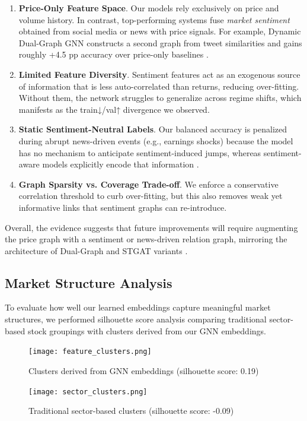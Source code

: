 \documentclass[12pt]{article}
\begin{document}
\begin{enumerate}[label=(\arabic*)]
    \item \textbf{Price-Only Feature Space}.  
          Our models rely exclusively on price and volume history.  
          In contrast, top-performing systems fuse \emph{market sentiment} obtained from social media or news with price signals.  
          For example, Dynamic Dual-Graph GNN constructs a second graph from tweet similarities and gains roughly +4.5 pp accuracy over price-only baselines \cite{du2023}.
    \item \textbf{Limited Feature Diversity}.  
          Sentiment features act as an exogenous source of information that is less auto-correlated than returns, reducing over-fitting.  
          Without them, the network struggles to generalize across regime shifts, which manifests as the train↓/val↑ divergence we observed.
    \item \textbf{Static Sentiment-Neutral Labels}.  
          Our balanced accuracy is penalized during abrupt news-driven events (e.g., earnings shocks) because the model has no mechanism to anticipate sentiment-induced jumps, whereas sentiment-aware models explicitly encode that information \cite{zhang2024}.
    \item \textbf{Graph Sparsity vs. Coverage Trade-off}.  
          We enforce a conservative correlation threshold to curb over-fitting, but this also removes weak yet informative links that sentiment graphs can re-introduce.
\end{enumerate}

Overall, the evidence suggests that future improvements will require augmenting the price graph with a sentiment or news-driven relation graph, mirroring the architecture of Dual-Graph and STGAT variants \cite{du2023,liu2025}.  

\subsection{Market Structure Analysis}

To evaluate how well our learned embeddings capture meaningful market structures, we performed silhouette score analysis comparing traditional sector-based stock groupings with clusters derived from our GNN embeddings.

\begin{figure}[h]
    \centering
    \begin{minipage}{0.48\textwidth}
        \centering
        \texttt{[image: feature\_clusters.png]}
        \caption{Clusters derived from GNN embeddings (silhouette score: 0.19)}
        \label{fig:feature_clusters}
    \end{minipage}\hfill
    \begin{minipage}{0.48\textwidth}
        \centering
        \texttt{[image: sector\_clusters.png]}
        \caption{Traditional sector-based clusters (silhouette score: -0.09)}
        \label{fig:sector_clusters}
    \end{minipage}
\end{figure}
\end{document}
